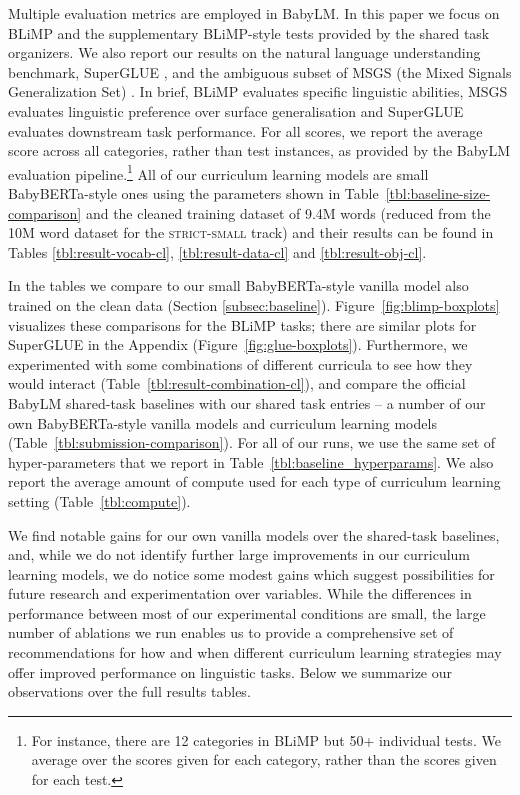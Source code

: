 Multiple evaluation metrics are employed in BabyLM. In this paper we focus on BLiMP \cite{warstadt2020blimp} and the supplementary BLiMP-style tests provided by the shared task organizers. We also report our results on the natural language understanding benchmark, SuperGLUE \cite{wang2019superglue}, and the ambiguous subset of MSGS (the Mixed Signals Generalization Set) \cite{warstadt2020msgs}. In brief, BLiMP evaluates specific linguistic abilities, MSGS evaluates linguistic preference over surface generalisation and SuperGLUE evaluates downstream task performance. For all scores, we report the average score across all categories, rather than test instances, as provided by the BabyLM evaluation pipeline.\footnote{For instance, there are 12 categories in BLiMP but 50+ individual tests. We average over the scores given for each category, rather than the scores given for each test.} All of our curriculum learning models are small BabyBERTa-style ones using the parameters shown in Table~\ref{tbl:baseline-size-comparison} and the cleaned training dataset of 9.4M words (reduced from the 10M word dataset for the \textsc{strict-small} track) and their results can be found in Tables \ref{tbl:result-vocab-cl}, \ref{tbl:result-data-cl} and \ref{tbl:result-obj-cl}. 

In the tables we compare to our small BabyBERTa-style vanilla model also trained on the clean data (Section \ref{subsec:baseline}). Figure~\ref{fig:blimp-boxplots} visualizes these comparisons for the BLiMP tasks; there are  similar plots for SuperGLUE in the Appendix (Figure~\ref{fig:glue-boxplots}).
Furthermore, we experimented with some combinations of different curricula to see how they would interact (Table~\ref{tbl:result-combination-cl}), and compare the official BabyLM shared-task baselines with our shared task entries -- a number of our own BabyBERTa-style vanilla models and curriculum learning models (Table~\ref{tbl:submission-comparison}). For all of our runs, we use the same set of hyper-parameters that we report in Table~\ref{tbl:baseline_hyperparams}. We also report the average amount of compute used for each type of curriculum learning setting (Table~\ref{tbl:compute}).

 
We find notable gains for our own vanilla models over the shared-task baselines, and, while we do not identify further large improvements in our curriculum learning models, we do notice some modest gains which suggest possibilities for future research and experimentation over variables. While the differences in performance between most of our experimental conditions are small, the large number of ablations we run enables us to provide a comprehensive set of recommendations for how and when different curriculum learning strategies may offer improved performance on linguistic tasks.
Below we summarize our observations over the full results tables.


